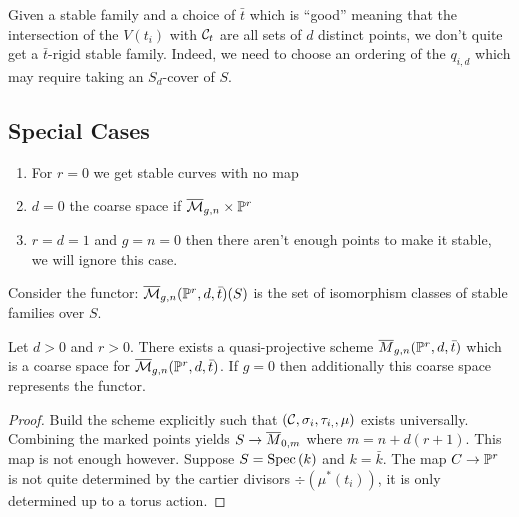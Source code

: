 \documentclass[12pt]{article}
\begin{document}
\begin{rmk}
Given a stable family and a choice of $\bar{t}$ which is ``good'' meaning that the intersection of the $V(t_i)$ with $\C_t$ are all sets of $d$ distinct points, we don't quite get a $\bar{t}$-rigid stable family. Indeed, we need to choose an ordering of the $q_{i,d}$ which may require taking an $S_d$-cover of $S$. 
\end{rmk}

\subsection{Special Cases}

\newcommand{\barM}{\ol{\mathcal{M}}}

\begin{enumerate}
\item 
For $r = 0$ we get stable curves with no map
\item $d = 0$ the coarse space if $\barM_{g,n} \times \P^r$ 
\item $r = d = 1$ and $g = n = 0$ then there aren't enough points to make it stable, we will ignore this case. 
\end{enumerate}

\begin{defn}
Consider the functor:
$\barM_{g,n}(\P^r, d, \bar{t})(S)$ is the set of isomorphism classes of stable families over $S$. 
\end{defn}

\begin{theorem}
Let $d > 0$ and $r > 0$.
There exists a quasi-projective scheme $\ol{M}_{g,n}(\P^r, d, \bar{t})$ which is a coarse space for $\barM_{g,n}(\P^r, d, \bar{t})$. If $g = 0$ then additionally this coarse space represents the functor.  
\end{theorem}

\begin{proof}
Build the scheme explicitly such that $(\C, \sigma_i, \tau_{i,}, \mu)$ exists universally. Combining the marked points yields $S \to \ol{M}_{0,m}$ where $m = n + d(r+1)$. This map is not enough however. Suppose $S = \Spec{k}$ and $k = \bar{k}$. The map $C \to \P^r$ is not quite determined by the cartier divisors $\div(\mu^*(t_i))$, it is only determined up to a torus action. 
\end{proof}
\end{document}
